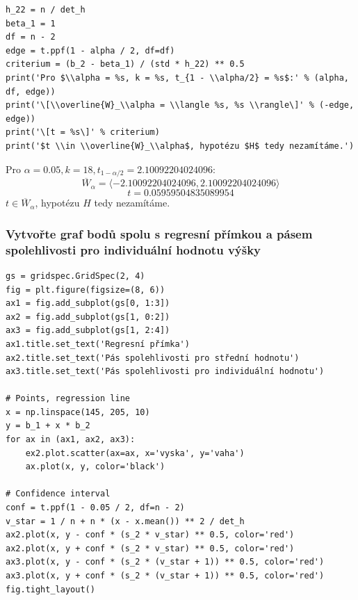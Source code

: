 \documentclass[11pt,titlepage]{article}
\begin{document}
\begin{listing}[htbp]
\begin{verbatim}
h_22 = n / det_h
beta_1 = 1
df = n - 2
edge = t.ppf(1 - alpha / 2, df=df)
criterium = (b_2 - beta_1) / (std * h_22) ** 0.5
print('Pro $\\alpha = %s, k = %s, t_{1 - \\alpha/2} = %s$:' % (alpha, df, edge))
print('\[\\overline{W}_\\alpha = \\langle %s, %s \\rangle\]' % (-edge, edge))
print('\[t = %s\]' % criterium)
print('$t \\in \\overline{W}_\\alpha$, hypotézu $H$ tedy nezamítáme.')
\end{verbatim}
\end{listing}

Pro \(\alpha = 0.05, k = 18, t_{1 - \alpha/2} = 2.10092204024096\):
\[\overline{W}_\alpha = \langle -2.10092204024096, 2.10092204024096 \rangle\]
\[t = 0.05959504835089954\]
\(t \in \overline{W}_\alpha\), hypotézu \(H\) tedy nezamítáme.
\newpage

\subsubsection{Vytvořte graf bodů spolu s regresní přímkou a pásem spolehlivosti pro individuální hodnotu výšky}
\label{sec:org8fa6601}

\begin{listing}[htbp]
\begin{verbatim}
gs = gridspec.GridSpec(2, 4)
fig = plt.figure(figsize=(8, 6))
ax1 = fig.add_subplot(gs[0, 1:3])
ax2 = fig.add_subplot(gs[1, 0:2])
ax3 = fig.add_subplot(gs[1, 2:4])
ax1.title.set_text('Regresní přímka')
ax2.title.set_text('Pás spolehlivosti pro střední hodnotu')
ax3.title.set_text('Pás spolehlivosti pro individuální hodnotu')

# Points, regression line
x = np.linspace(145, 205, 10)
y = b_1 + x * b_2
for ax in (ax1, ax2, ax3):
    ex2.plot.scatter(ax=ax, x='vyska', y='vaha')
    ax.plot(x, y, color='black')

# Confidence interval
conf = t.ppf(1 - 0.05 / 2, df=n - 2)
v_star = 1 / n + n * (x - x.mean()) ** 2 / det_h
ax2.plot(x, y - conf * (s_2 * v_star) ** 0.5, color='red')
ax2.plot(x, y + conf * (s_2 * v_star) ** 0.5, color='red')
ax3.plot(x, y - conf * (s_2 * (v_star + 1)) ** 0.5, color='red')
ax3.plot(x, y + conf * (s_2 * (v_star + 1)) ** 0.5, color='red')
fig.tight_layout()
\end{verbatim}
\end{listing}
\end{document}
